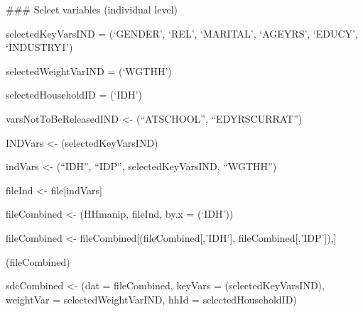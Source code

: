 \documentclass[letterpaper,10pt,english]{sphinxmanual}
\begin{document}
\begin{DUlineblock}{0em}
\item[] \#\#\# Select variables (individual level)
\item[] selectedKeyVarsIND = (‘GENDER’, ‘REL’, ‘MARITAL’, ‘AGEYRS’,
‘EDUCY’, ‘INDUSTRY1’) 
\item[] 
\item[] selectedWeightVarIND = (‘WGTHH’)
\item[] 
\item[] selectedHouseholdID = (‘IDH’)
\item[] 
\item[] varsNotToBeReleasedIND \textless{}- (“ATSCHOOL”, “EDYRSCURRAT”)
\item[] 
\item[] INDVars \textless{}- (selectedKeyVarsIND)
\item[] 
\item[] indVars \textless{}- (“IDH”, “IDP”, selectedKeyVarsIND, “WGTHH”) 
\item[] fileInd \textless{}- file{[}indVars{]} 
\item[] fileCombined \textless{}- (HHmanip, fileInd, by.x = (‘IDH’))
\item[] fileCombined \textless{}- fileCombined{[}(fileCombined{[},’IDH’{]},
fileCombined{[},’IDP’{]}),{]}
\item[] (fileCombined)
\end{DUlineblock}


\begin{DUlineblock}{0em}
\item[] 
\item[] sdcCombined \textless{}- (dat = fileCombined, keyVars =
(selectedKeyVarsIND), weightVar = selectedWeightVarIND, hhId =
selectedHouseholdID)
\end{DUlineblock}
\end{document}
